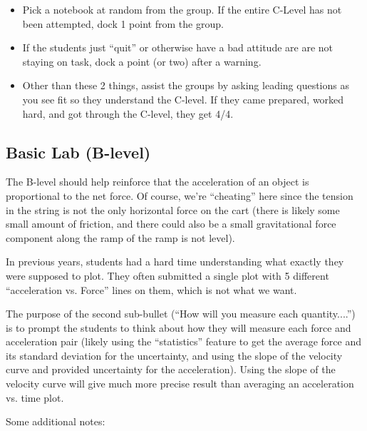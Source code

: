 \documentclass[fleqn,letterpaper]{article}
\begin{document}
\begin{itemize}
 \item{Pick a notebook at random from the group.  If the entire C-Level has not been attempted, dock 1 point from the group.}
 \item{If the students just ``quit'' or otherwise have a bad attitude are are not staying on task, dock a point (or two) after a warning.}
 \item{Other than these 2 things, assist the groups by asking leading questions as you see fit so they understand the C-level.  If they came prepared, worked hard, and got through the C-level, they get 4/4.}
\end{itemize}


\subsection*{Basic Lab (B-level)}

The B-level should help reinforce that the acceleration of an object is proportional to the net force.  Of course, we're ``cheating'' here since the tension in the string is not the only horizontal force on the cart (there is likely some small amount of friction, and there could also be a small gravitational force component along the ramp of the ramp is not level).

In previous years, students had a hard time understanding what exactly they were supposed to plot.  They often submitted a single plot with 5 different ``acceleration vs. Force'' lines on them, which is not what we want.  

The purpose of the second sub-bullet (``How will you measure each quantity....'') is to prompt the students to think about how they will measure each force and acceleration pair (likely using the ``statistics'' feature to get the average force and its standard deviation for the uncertainty, and using the slope of the velocity curve and provided uncertainty for the acceleration).  Using the slope of the velocity curve will give much more precise result than averaging an acceleration vs. time plot.

Some additional notes:
\end{document}
